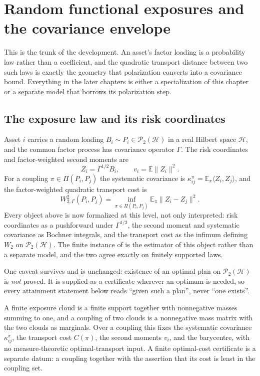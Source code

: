 \chapter{Random functional exposures and the covariance envelope}
\label{chap:random-exposure}

This is the trunk of the development.
An asset's factor loading is a probability law rather than a coefficient, and
the quadratic transport distance between two such laws is exactly the geometry
that polarization converts into a covariance bound.
Everything in the later chapters is either a specialization of this chapter or a
separate model that borrows its polarization step.

\section{The exposure law and its risk coordinates}

\begin{definition}
  \label{def:exposure-law}
  Asset \(i\) carries a random loading \(B_i\sim P_i\in\mathcal
  P_2(\mathcal H)\)
  in a real Hilbert space \(\mathcal H\), and the common factor process has
  covariance operator \(\Gamma\).
  The risk coordinates and factor-weighted second moments are
  \[
    Z_i=\Gamma^{1/2}B_i,\qquad v_i=\mathbb E\lVert Z_i\rVert^2 .
  \]
  For a coupling \(\pi\in\Pi(P_i,P_j)\) the systematic covariance is
  \(\kappa^\pi_{ij}=\mathbb E_\pi\langle Z_i,Z_j\rangle\), and the
  factor-weighted quadratic transport cost is
  \[
    W_{2,\Gamma}^2(P_i,P_j)
    =\inf_{\pi\in\Pi(P_i,P_j)}\mathbb E_\pi\lVert Z_i-Z_j\rVert^2 .
  \]
  Every object above is now formalized at this level, not only interpreted:
  risk coordinates as a pushforward under \(\Gamma^{1/2}\), the second moment
  and systematic covariance as Bochner integrals, and the transport cost as the
  infimum defining \(W_2\) on \(\mathcal P_2(\mathcal H)\).
  The finite instance of  is the estimator of
  this object rather than a separate model, and the two agree exactly on
  finitely supported laws.

  One caveat survives and is unchanged: existence of an optimal plan on
  \(\mathcal P_2(\mathcal H)\) is \emph{not} proved.
  It is supplied as a certificate wherever an optimum is needed, so every
  attainment statement below reads ``given such a plan'', never ``one exists''.
\end{definition}

\begin{definition}
  \label{def:finite-exposure-cloud}
  A finite exposure cloud is a finite support together with nonnegative masses
  summing to one, and a coupling of two clouds is a nonnegative mass matrix with
  the two clouds as marginals.
  Over a coupling this fixes the systematic covariance
  \(\kappa^\pi_{ij}\), the transport cost \(C(\pi)\), the second moments
  \(v_i\), and the barycentre, with no measure-theoretic optimal-transport
  input.
  A finite optimal-cost certificate is a separate datum: a coupling together
  with the assertion that its cost is least in the coupling set.
\end{definition}

